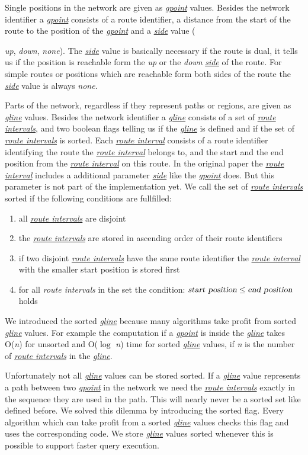 \documentclass[a4paper]{article}
\newcommand{\var}[1]{\textsl{#1}}
\newcommand{\dt}[1]{\textsl{\underline{#1}}}
\begin{document}
Single positions in the network are given as \dt{gpoint} values. Besides the network identifier a \dt{gpoint} consists of a route identifier, a distance from the start of the route to the position of the \dt{gpoint} and a \dt{side} value ({\var{up}, \var{down}, \var{none}). The \dt{side} value is basically necessary if the route is dual, it tells us if the position is reachable form the \var{up} or the \var{down} \dt{side} of the route. For simple routes or positions which are reachable form both sides of the route the \dt{side} value is always \var{none}.

Parts of the network, regardless if they represent paths or regions, are given as \dt{gline} values. Besides the network identifier a \dt{gline} consists of a set of \dt{route intervals}, and two boolean flags telling us if the \dt{gline} is defined and if the set of \dt{route intervals} is sorted. Each \dt{route interval} consists of a route identifier identifying the route the \dt{route interval} belongs to, and the start and the end position from the \dt{route interval} on this route. In the original paper the \dt{route interval} includes a additional parameter \dt{side} like the \dt{gpoint} does. But this parameter is not part of the implementation yet. We call the \label{sec:sortedgline} set of \dt{route intervals} sorted if the following conditions are fullfilled:
\begin{enumerate}
	\item all \dt{route intervals} are disjoint
	\item the \dt{route intervals} are stored in ascending order of their route identifiers
	\item if two disjoint \dt{route intervals} have the same route identifier the \dt{route interval} with the smaller start position is stored first
	\item for all \var{route intervals} in the set the condition: $\var{start position} \le \var{end position}$ holds
\end{enumerate}
We introduced the sorted \dt{gline} because many algorithms take profit from sorted \dt{gline} values. For example the computation if a \dt{gpoint} is inside the \dt{gline} takes O(\var{n}) for unsorted and O($\log$ \var{n}) time for sorted \dt{gline} values, if \var{n} is the number of \dt{route intervals} in the \dt{gline}.

Unfortunately not all \dt{gline} values can be stored sorted. If a \dt{gline} value represents a path between two \dt{gpoint} in the network we need the \dt{route intervals} exactly in the sequence they are used in the path. This will nearly never be a sorted set like defined before. We solved this dilemma by introducing the sorted flag. Every algorithm which can take profit from a sorted \dt{gline} values checks this flag and uses the corresponding code. We store  \dt{gline} values sorted whenever this is possible to support faster query execution.

}
\end{document}
